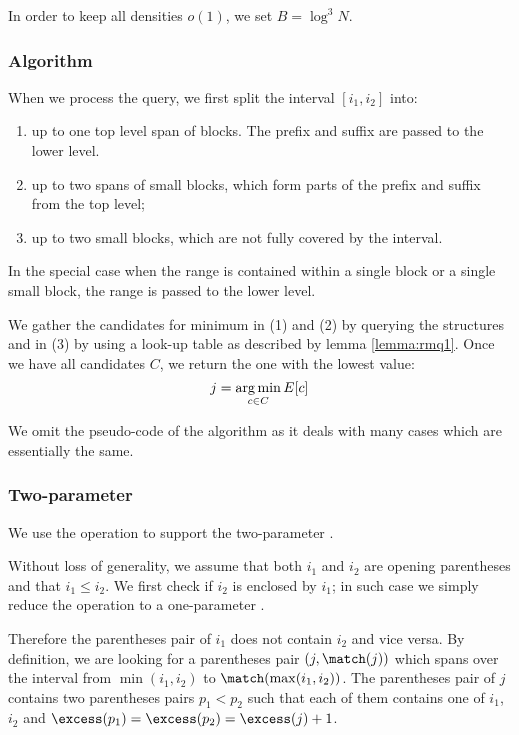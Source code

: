 In order to keep all densities $o(1)$, we set $B = \log^3 N$.

\subsubsection{Algorithm}

When we process the query, we first split the interval $[i_1, i_2]$ into:
\begin{enumerate}
	\item up to one top level span of blocks.
	The prefix and suffix are passed to the lower level.
	\item up to two spans of small blocks, which form parts of the prefix and suffix from the top level;
	\item up to two small blocks, which are not fully covered by the interval.
\end{enumerate}
In the special case when the range is contained within a single block or a single small block, the range is passed to the lower level.

We gather the candidates for minimum in (1) and (2) by querying the \rmqi{} structures and in (3) by using a look-up table as described by lemma \ref{lemma:rmq1}.
Once we have all candidates $C$, we return the one with the lowest value:
$$ j = \operatorname*{arg\,min}_{c \in C} E[c] $$

We omit the pseudo-code of the algorithm as it deals with many cases which are essentially the same.

\subsubsection{\label{ss:enclose2}Two-parameter \enclose}

We use the operation \rmqi{} to support the two-parameter \enclose{}.

Without loss of generality, we assume that both $i_1$ and $i_2$ are opening parentheses and that $i_1 \le i_2$.
We first check if $i_2$ is enclosed by $i_1$; in such case we simply reduce the operation to a one-parameter \enclose{}.

Therefore the parentheses pair of $i_1$ does not contain $i_2$ and vice versa.
By definition, we are looking for a parentheses pair $(j, \match(j))$ which spans over the interval from $\min(i_1, i_2)$ to $\match(\max(i_1, i_2))$.
The parentheses pair of $j$ contains two parentheses pairs $p_1 < p_2$ such that each of them contains one of $i_1$, $i_2$ and $\excess(p_1) = \excess(p_2) = \excess(j) + 1$.

